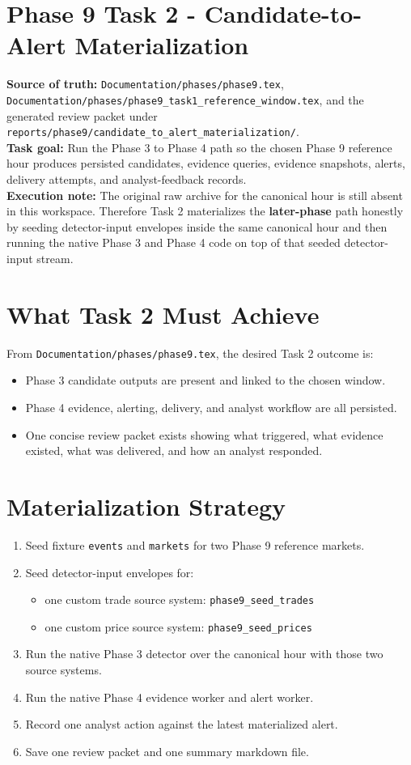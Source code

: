 \documentclass{article}
\begin{document}
\section*{Phase 9 Task 2 - Candidate-to-Alert Materialization}

\textbf{Source of truth:} \texttt{Documentation/phases/phase9.tex}, \texttt{Documentation/phases/phase9\_task1\_reference\_window.tex}, and the generated review packet under \texttt{reports/phase9/candidate\_to\_alert\_materialization/}.\\
\textbf{Task goal:} Run the Phase 3 to Phase 4 path so the chosen Phase 9 reference hour produces persisted candidates, evidence queries, evidence snapshots, alerts, delivery attempts, and analyst-feedback records.\\
\textbf{Execution note:} The original raw archive for the canonical hour is still absent in this workspace. Therefore Task 2 materializes the \textbf{later-phase} path honestly by seeding detector-input envelopes inside the same canonical hour and then running the native Phase 3 and Phase 4 code on top of that seeded detector-input stream.

\section*{What Task 2 Must Achieve}
From \texttt{Documentation/phases/phase9.tex}, the desired Task 2 outcome is:
\begin{itemize}
\item Phase 3 candidate outputs are present and linked to the chosen window.
\item Phase 4 evidence, alerting, delivery, and analyst workflow are all persisted.
\item One concise review packet exists showing what triggered, what evidence existed, what was delivered, and how an analyst responded.
\end{itemize}

\section*{Materialization Strategy}
\begin{enumerate}
\item Seed fixture \texttt{events} and \texttt{markets} for two Phase 9 reference markets.
\item Seed detector-input envelopes for:
\begin{itemize}
\item one custom trade source system: \texttt{phase9\_seed\_trades}
\item one custom price source system: \texttt{phase9\_seed\_prices}
\end{itemize}
\item Run the native Phase 3 detector over the canonical hour with those two source systems.
\item Run the native Phase 4 evidence worker and alert worker.
\item Record one analyst action against the latest materialized alert.
\item Save one review packet and one summary markdown file.
\end{enumerate}
\end{document}
